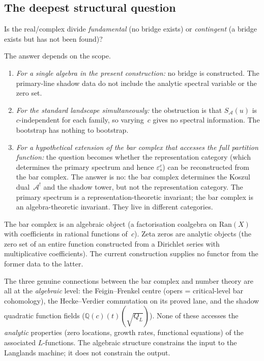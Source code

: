 \documentclass[11pt]{article}
\newcommand{\cA}{\mathcal{A}}
\newcommand{\Q}{\mathbb{Q}}
\begin{document}
\subsection{The deepest structural question}

Is the real/complex divide \emph{fundamental} (no bridge
exists) or \emph{contingent} (a bridge exists but has not been
found)?

The answer depends on the scope.

\begin{enumerate}
\item \emph{For a single algebra in the present construction:}
no bridge is constructed.  The primary-line shadow data do not
include the analytic spectral variable or the zero set.

\item \emph{For the standard landscape simultaneously:}
the obstruction is that $S_\cA(u)$ is $c$-independent for each
family, so varying~$c$ gives no spectral information.  The
bootstrap has nothing to bootstrap.

\item \emph{For a hypothetical extension of the bar complex
that accesses the full partition function:} the question
becomes whether the representation category (which determines
the primary spectrum and hence $\varepsilon^c_s$) can be
reconstructed from the bar complex.  The answer is no: the bar
complex determines the Koszul dual~$\cA^!$ and the shadow
tower, but not the representation category.  The primary
spectrum is a representation-theoretic invariant; the bar
complex is an algebra-theoretic invariant.  They live in
different categories.
\end{enumerate}

The bar complex is an algebraic object (a factorisation coalgebra
on $\mathrm{Ran}(X)$ with coefficients in rational functions
of~$c$).  Zeta zeros are analytic objects (the zero set of an
entire function constructed from a Dirichlet series with
multiplicative coefficients).  The current construction supplies
no functor from the former data to the latter.

The three genuine connections between the bar complex and
number theory are all at the \emph{algebraic} level:
the Feigin--Frenkel centre (opers = critical-level bar
cohomology), the Hecke--Verdier commutation on its proved lane,
and the shadow quadratic function fields
($\Q(c)(t)(\sqrt{Q_L})$).
None of these accesses the \emph{analytic} properties
(zero locations, growth rates, functional equations) of the
associated $L$-functions.  The algebraic structure constrains
the input to the Langlands machine; it does not constrain the
output.
\end{document}
